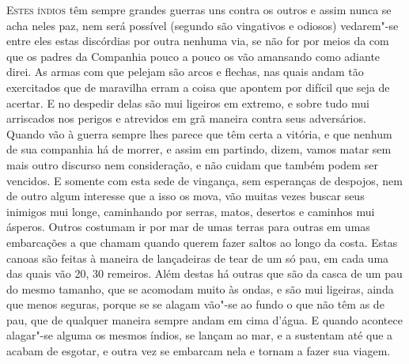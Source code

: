 \noindent\textsc{Estes índios} têm sempre grandes guerras uns contra os outros e assim	%
nunca se acha neles paz, nem será possível (segundo são vingativos e
odiosos) vedarem"-se entre eles estas discórdias por outra nenhuma via,
se não for por meios da  com que os padres da Companhia		%
pouco a pouco os vão amansando como adiante direi. As armas com que
pelejam são arcos e flechas, nas quais andam tão exercitados que  de			%
maravilha erram a coisa que apontem por difícil que seja de acertar. E no
despedir delas são mui ligeiros em extremo, e sobre tudo mui arriscados
nos perigos e atrevidos em grã maneira contra seus adversários. Quando
vão à guerra sempre lhes parece que têm certa a vitória, e que nenhum
de sua companhia há de morrer, e assim em partindo, dizem, vamos matar
sem mais outro discurso nem consideração, e não cuidam que também podem
ser vencidos. E somente com esta sede de vingança, sem esperanças de
despojos, nem de outro algum interesse que a isso os mova, vão muitas
vezes buscar seus inimigos mui longe, caminhando por serras, matos,
desertos e caminhos mui ásperos. Outros costumam ir por mar de umas
terras para outras em umas embarcações a que chamam  quando querem
fazer saltos ao longo da costa. Estas canoas são feitas à maneira de
lançadeiras de tear de um só pau, em cada uma das quais vão 20, 30
remeiros. Além destas há outras que são da casca de um pau do mesmo
tamanho, que se acomodam muito às ondas, e são mui ligeiras, ainda que
menos seguras, porque se se alagam vão"-se ao fundo o que não têm as de
pau, que de qualquer maneira sempre andam em cima
d'água. E quando acontece alagar"-se alguma os mesmos
índios, se lançam ao mar, e a sustentam até que a acabam de esgotar, e			%
outra vez se embarcam nela e tornam a fazer sua viagem.

